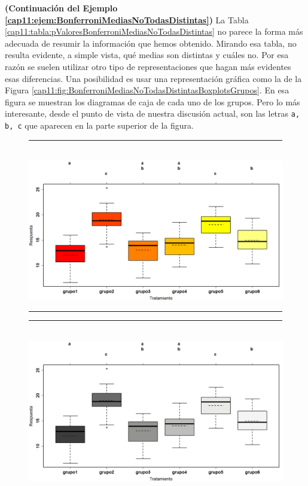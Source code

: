 \begin{ejemplo}{\bf (Continuación del Ejemplo \ref{cap11:ejem:BonferroniMediasNoTodasDistintas})}
\label{cap11:ejem:BonferroniMediasNoTodasDistintas02}
La Tabla \ref{cap11:tabla:pValoresBonferroniMediasNoTodasDistintas} no parece la forma más adecuada
de resumir la información que hemos obtenido. Mirando esa tabla, no resulta evidente, a simple vista, qué medias son distintas y cuáles no. Por esa razón se suelen utilizar otro tipo de representaciones que hagan más evidentes esas diferencias. Una posibilidad es usar una representación gráfica como la de la Figura
\ref{cap11:fig:BonferroniMediasNoTodasDistintasBoxplotsGrupos}. En esa figura se muestran los
diagramas de caja de cada uno de los grupos. Pero lo más interesante, desde el punto de vista de
nuestra discusión actual, son las letras {\tt a, b, c} que aparecen en la parte superior de la
figura.

\begin{figure}[htbp]
\begin{center}
\begin{enColor}
\hrule
\quad\\[2mm]
\includegraphics[width=13.5cm]{../fig/Cap11-BonferroniMediasNoTodasDistintas.png}

\hrule
\end{enColor}
\begin{bn}
\hrule
\quad\\[2mm]
\includegraphics[width=13.5cm]{../fig/Cap11-BonferroniMediasNoTodasDistintas-bn.png}


\end{bn}
\end{center}
\end{figure}
\end{ejemplo}
